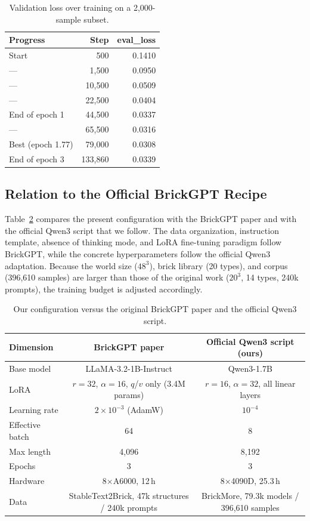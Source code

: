 \documentclass[10pt,twocolumn,letterpaper]{article}
\begin{document}
\begin{table}[t]
\centering
\small
\setlength{\tabcolsep}{4pt}
\begin{tabular}{lrr}
\toprule
Progress & Step & eval\_loss \\
\midrule
Start & 500 & 0.1410 \\
--- & 1,500 & 0.0950 \\
--- & 10,500 & 0.0509 \\
--- & 22,500 & 0.0404 \\
End of epoch 1 & 44,500 & 0.0337 \\
--- & 65,500 & 0.0316 \\
Best (epoch 1.77) & 79,000 & 0.0308 \\
End of epoch 3 & 133,860 & 0.0339 \\
\bottomrule
\end{tabular}
\caption{Validation loss over training on a 2,000-sample subset.}
\label{tab:eval-loss}
\end{table}

\subsection{Relation to the Official BrickGPT Recipe}
Table~\ref{tab:brickgpt-recipe} compares the present configuration with the BrickGPT paper and with the official Qwen3 script that we follow. The data organization, instruction template, absence of thinking mode, and LoRA fine-tuning paradigm follow BrickGPT, while the concrete hyperparameters follow the official Qwen3 adaptation. Because the world size ($48^3$), brick library (20 types), and corpus (396,610 samples) are larger than those of the original work ($20^3$, 14 types, 240k prompts), the training budget is adjusted accordingly.

\begin{table}[t]
\centering
\small
\setlength{\tabcolsep}{5pt}
\begin{tabular}{lcc}
\toprule
Dimension & BrickGPT paper & Official Qwen3 script (ours) \\
\midrule
Base model & LLaMA-3.2-1B-Instruct & Qwen3-1.7B \\
LoRA & $r=32$, $\alpha=16$, $q$/$v$ only (3.4M params) & $r=16$, $\alpha=32$, all linear layers \\
Learning rate & $2{\times}10^{-3}$ (AdamW) & $10^{-4}$ \\
Effective batch & 64 & 8 \\
Max length & 4,096 & 8,192 \\
Epochs & 3 & 3 \\
Hardware & 8$\times$A6000, 12\,h & 8$\times$4090D, 25.3\,h \\
Data & StableText2Brick, 47k structures / 240k prompts & BrickMore, 79.3k models / 396,610 samples \\
\bottomrule
\end{tabular}
\caption{Our configuration versus the original BrickGPT paper and the official Qwen3 script.}
\label{tab:brickgpt-recipe}
\end{table}
\end{document}
